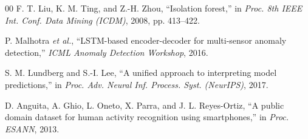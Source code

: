 \documentclass[conference]{IEEEtran}
\begin{document}
\begin{thebibliography}{00}
F. T. Liu, K. M. Ting, and Z.-H. Zhou,
``Isolation forest,''
in \textit{Proc. 8th IEEE Int. Conf. Data Mining (ICDM)}, 2008,
pp. 413–422.

P. Malhotra \textit{et al.},
``LSTM-based encoder-decoder for multi-sensor anomaly detection,''
\textit{ICML Anomaly Detection Workshop}, 2016.

S. M. Lundberg and S.-I. Lee,
``A unified approach to interpreting model predictions,''
in \textit{Proc. Adv. Neural Inf. Process. Syst. (NeurIPS)}, 2017.

D. Anguita, A. Ghio, L. Oneto, X. Parra, and J. L. Reyes-Ortiz,
``A public domain dataset for human activity recognition using smartphones,''
in \textit{Proc. ESANN}, 2013.

\end{thebibliography}
\end{document}
